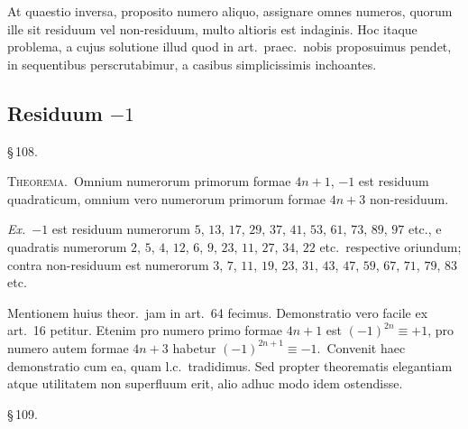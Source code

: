 \documentclass[12pt,a4paper]{article}
\theoremstyle{plain}
\theoremstyle{definition}
\theoremstyle{remark}
\begin{document}
At quaestio inversa, proposito numero aliquo, assignare omnes numeros, quorum ille sit residuum vel non-residuum, multo altioris est indaginis. Hoc itaque problema, a cujus solutione illud quod in art.\ praec.\ nobis proposuimus pendet, in sequentibus perscrutabimur, a casibus simplicissimis inchoantes.

\subsection*{Residuum $-1$}

\begin{center}\S\,108.\end{center}

\textsc{Theorema.}\ Omnium numerorum primorum formae $4n+1$, $-1$ est residuum quadraticum, omnium vero numerorum primorum formae $4n+3$ non-residuum.

\textit{Ex.}\ $-1$ est residuum numerorum $5$, $13$, $17$, $29$, $37$, $41$, $53$, $61$, $73$, $89$, $97$ etc., e quadratis numerorum $2$, $5$, $4$, $12$, $6$, $9$, $23$, $11$, $27$, $34$, $22$ etc.\ respective oriundum; contra non-residuum est numerorum $3$, $7$, $11$, $19$, $23$, $31$, $43$, $47$, $59$, $67$, $71$, $79$, $83$ etc.

Mentionem huius theor.\ jam in art.~64 fecimus. Demonstratio vero facile ex art.~16 petitur. Etenim pro numero primo formae $4n+1$ est $(-1)^{2n} \equiv +1$, pro numero autem formae $4n+3$ habetur $(-1)^{2n+1} \equiv -1$.\ Convenit haec demonstratio cum ea, quam l.c.\ tradidimus. Sed propter theorematis elegantiam atque utilitatem non superfluum erit, alio adhuc modo idem ostendisse.

\begin{center}\S\,109.\end{center}
\end{document}
